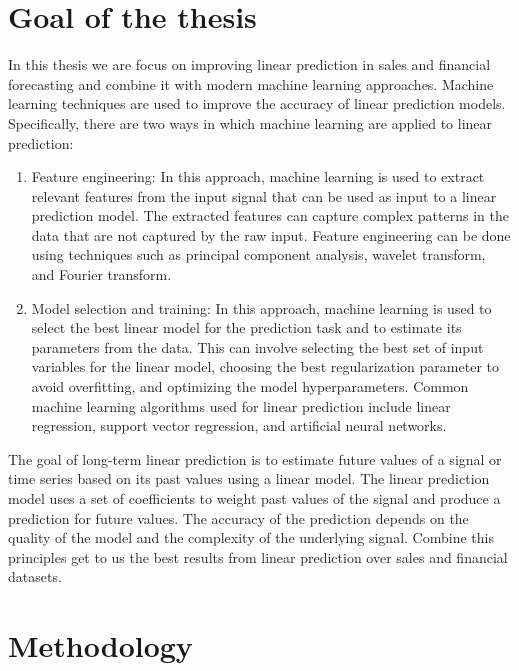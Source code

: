 \chapter{Goal of the thesis} \label{sec:goal}
In this thesis we are focus on improving linear prediction in sales and financial forecasting and combine it with modern machine learning approaches.
Machine learning techniques are used to improve the accuracy of linear prediction models.
Specifically, there are two ways in which machine learning are applied to linear prediction:
\begin{enumerate}
    \item Feature engineering: In this approach, machine learning is used to extract relevant features from the input signal that can be used as input to a linear prediction model.
The extracted features can capture complex patterns in the data that are not captured by the raw input.
Feature engineering can be done using techniques such as principal component analysis, wavelet transform, and Fourier transform.
    \item Model selection and training: In this approach, machine learning is used to select the best linear model for the prediction task and to estimate its
parameters from the data. This can involve selecting the best set of input variables for the linear model, choosing the best
regularization parameter to avoid overfitting, and optimizing the model hyperparameters. Common machine learning algorithms used for linear
prediction include linear regression, support vector regression, and artificial neural networks.
\end{enumerate}
The goal of long-term linear prediction is to estimate future values of a signal or time series based on its past
values using a linear model.
The linear prediction model uses a set of coefficients to weight past values of the signal and produce a prediction for
future values. The accuracy of the prediction depends on the quality of the model and the complexity of the underlying signal.
Combine this principles get to us the best results from linear prediction over sales and financial datasets.
\chapter{Methodology} \label{sec:methodology}
